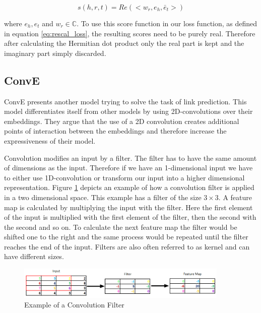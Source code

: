 \begin{equation}
\label{score_complex}
s(h,r,t)=Re(<w_r,e_h,\bar{e}_t>)
\end{equation}

where $e_h, e_t$ and $w_r\in \mathbb{C}$. To use this score function in our loss function, as defined in equation \ref{eq:rescal_loss}, the resulting scores need to be purely real. Therefore after calculating the Hermitian dot product only the real part is kept and the imaginary part simply discarded.  

\subsection{ConvE}
\label{cha:conve}
ConvE \cite{dettmers_convolutional_2018} presents another model trying to solve the task of link prediction. This model differentiates itself from other models by using 2D-convolutions over their embeddings. They argue that the use of a 2D convolution creates additional points of interaction between the embeddings and therefore increase the expressiveness of their model. 

Convolution modifies an input by a filter. The filter has to have the same amount of dimensions as the input. Therefore if we have an 1-dimensional input we have to either use 1D-convolution or transform our input into a higher dimensional representation. Figure \ref{fig:example_conv} depicts an example of how a convolution filter is applied in a two dimensional space. This example has a filter of the size $3 \times 3$. A feature map is calculated by multiplying the input with the filter. Here the first element of the input is multiplied with the first element of the filter, then the second with the second and so on. To calculate the next feature map the filter would be shifted one to the right and the same process would be repeated until the filter reaches the end of the input. Filters are also often referred to as kernel and can have different sizes. \cite{zhang_parallel_1990}

\begin{figure}[H]
\centering
\includegraphics[width=0.9\textwidth]{images/convolution_filter_example.png}
\caption{Example of a Convolution Filter}
\label{fig:example_conv}
\end{figure}

